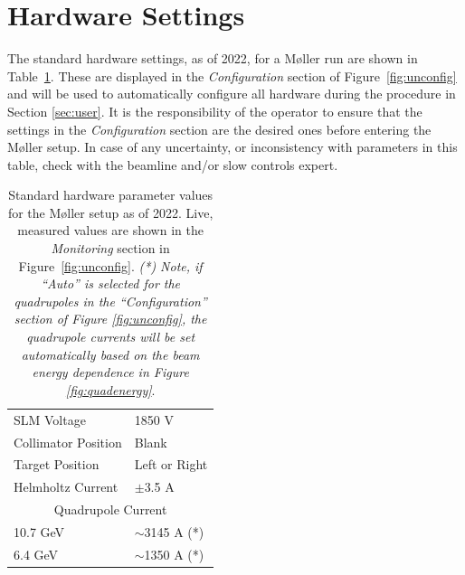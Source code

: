\documentclass[amsmath,amssymb,notitlepage,12pt]{revtex4}
\begin{document}
\newpage

\section{Hardware Settings}
The standard hardware settings, as of 2022, for a M{\o}ller run are shown in Table~\ref{tab:pars}.  These are displayed in the {\em Configuration} section of Figure~\ref{fig:unconfig} and will be used to automatically configure all hardware during the procedure in Section \ref{sec:user}.  It is the responsibility of the operator to ensure that the settings in the {\em Configuration} section are the desired ones before entering the M{\o}ller setup.  In case of any uncertainty, or inconsistency with parameters in this table, check with the beamline and/or slow controls expert.
\begin{table}[htbp]\centering
    \begin{tabular}{ll}\toprule[1.5pt]
        SLM Voltage & 1850 V \\
        Collimator Position & Blank \\
        Target Position & Left or Right \\
        Helmholtz Current & $\pm$3.5 A \\
        \cmidrule[0.5pt]{1-2}
        \multicolumn{2}{c}{Quadrupole Current} \\
        10.7 GeV & $\sim$3145 A (*)\\
        6.4 GeV & $\sim$1350 A (*)\\
        \bottomrule[1.5pt]
    \end{tabular}
    \caption{Standard hardware parameter values for the M{\o}ller setup as of 2022.  Live, measured values are shown in the {\em Monitoring} section in Figure~\ref{fig:unconfig}. {\em (*) Note, if ``Auto'' is selected for the quadrupoles in the ``Configuration'' section of Figure \ref{fig:unconfig}, the quadrupole currents will be set automatically based on the beam energy dependence in Figure \ref{fig:quadenergy}}.\label{tab:pars}}
\end{table}
\end{document}
